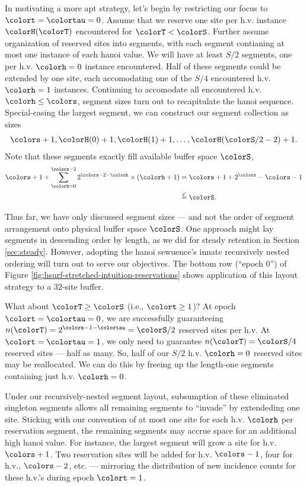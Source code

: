 In motivating a more apt strategy, let's begin by restricting our focus to $\colort=\colortau=0$.
Assume that we reserve one site per h.v. instance $\colorH(\colorT)$ encountered for $\colorT < \colorS$.
Further assume organization of reserved sites into segments, with each segment contianing at most one instance of each hanoi value.
We will have at least $S/2$ segments, one per h.v. $\colorh=0$ instance encountered.
Half of these segments could be extended by one site, each accomodating one of the $S/4$ encountered h.v. $\colorh=1$ instances.
Continuing to accomodate all encountered h.v. $\colorh\leq\colors$, segment sizes turn out to recapitulate the hanoi sequence.
Special-casing the largest segment, we can construct our segment collection as sizes
\begin{align*}
\colors + 1, \colorH(0) + 1, \colorH(1) + 1, \ldots, \colorH(\colorS/2 - 2) + 1.
\end{align*}
Note that these segments exactly fill available buffer space $\colorS$,
\begin{align*}
\colors + 1
+  \sum_{\colorh = 0}^{\colors - 2}
2^{\colors - 2 - \colorh} \times (\colorh + 1)
&=
\colors + 1 +
2^{\colors} - \colors - 1\\
&\stackrel{\checkmark}{=}
\colorS.
\end{align*}

Thus far, we have only discussed segment sizes --- and not the order of segment arrangement onto physical buffer space $\colorS$.
One approach might lay segments in descending order by length, as we did for steady retention in Section \ref{sec:steady}.
However, adopting the hanoi sewuence's innate recursively nested ordering will turn out to serve our objectives.
The bottom row (``epoch 0'') of Figure \ref{fig:hsurf-stretched-intuition-reservations} shows application of this layout strategy to a 32-site buffer.

What about $\colorT \geq \colorS$ (i.e., $\colort \geq 1$)?
At epoch $\colort=\colortau=0$, we are successfully guaranteeing $n(\colorT) = 2^{\colors - 1 - \colortau} = \colorS / 2$ reserved sites per h.v.
At $\colort=\colortau=1$, we only need to guarantee $n(\colorT) = \colorS/4$ reserved sites --- half as many.
So, half of our $S/2$ h.v. $\colorh=0$ reserved sites may be reallocated.
We can do this by freeing up the length-one segments containing just h.v. $\colorh=0$.

Under our recursively-nested segment layout, subsumption of these eliminated singleton segments allows all remaining segments to ``invade'' by extendeding one site.
Sticking with our convention of at most one site for each h.v. $\colorh$ per reservation segment, the remaining segments may accrue space for an additional high hanoi value.
For instance, the largest segment will grow a site for h.v. $\colors +1$.
Two reservation sites will be added for h.v. $\colors - 1$, four for h.v., $\colors - 2$, etc. --- mirroring the distribution of new incidence counts for these h.v.'s during epoch $\colort=1$.

